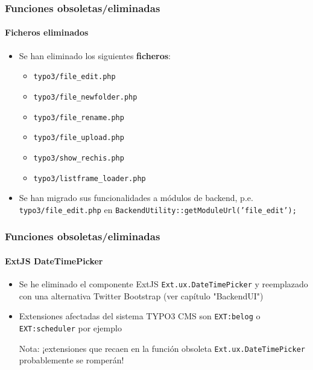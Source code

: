 \begin{frame}[fragile]
	\frametitle{Funciones obsoletas/eliminadas}
	\framesubtitle{Ficheros eliminados}

	\begin{itemize}
		\item Se han eliminado los siguientes \textbf{ficheros}:

			\begin{itemize}
				\item \texttt{typo3/file\_edit.php}
				\item \texttt{typo3/file\_newfolder.php}
				\item \texttt{typo3/file\_rename.php}
				\item \texttt{typo3/file\_upload.php}
				\item \texttt{typo3/show\_rechis.php}
				\item \texttt{typo3/listframe\_loader.php}
			\end{itemize}

		\item Se han migrado sus funcionalidades a módulos de backend,
			p.e. \texttt{typo3/file\_edit.php} en \texttt{BackendUtility::getModuleUrl('file\_edit');}

	\end{itemize}

\end{frame}


\begin{frame}[fragile]
	\frametitle{Funciones obsoletas/eliminadas}
	\framesubtitle{ExtJS DateTimePicker}

	\begin{itemize}

		\item Se he eliminado el componente ExtJS \texttt{Ext.ux.DateTimePicker} y reemplazado
			con una alternativa Twitter Bootstrap (ver capítulo "BackendUI")

		\item Extensiones afectadas del sistema TYPO3 CMS son \texttt{EXT:belog} o
			\texttt{EXT:scheduler} por ejemplo

			\vspace{0.2cm}

			\begingroup
				\color{red}
					Nota: ¡extensiones que recaen en la función obsoleta
					\texttt{Ext.ux.DateTimePicker} probablemente se romperán!
			\endgroup

	\end{itemize}

\end{frame}

